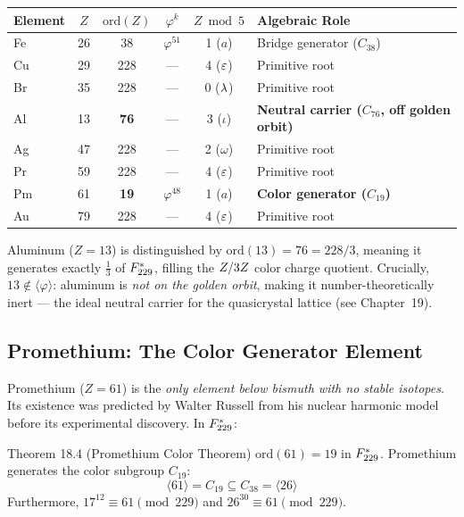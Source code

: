 \begin{center}
\begin{tabular}{lccccl}
\toprule
\textbf{Element} & $Z$ & $\text{ord}(Z)$ & $\varphi^k$ & $Z \bmod 5$ & \textbf{Algebraic Role} \\
\midrule
Fe & 26 & 38 & $\varphi^{51}$ & 1 ($a$) & Bridge generator ($C_{38}$) \\
Cu & 29 & 228 & --- & 4 ($\varepsilon$) & Primitive root \\
Br & 35 & 228 & --- & 0 ($\lambda$) & Primitive root \\
Al & 13 & \textbf{76} & --- & 3 ($\iota$) & \textbf{Neutral carrier ($C_{76}$, off golden orbit)} \\
Ag & 47 & 228 & --- & 2 ($\omega$) & Primitive root \\
Pr & 59 & 228 & --- & 4 ($\varepsilon$) & Primitive root \\
Pm & 61 & \textbf{19} & $\varphi^{48}$ & 1 ($a$) & \textbf{Color generator ($C_{19}$)} \\
Au & 79 & 228 & --- & 4 ($\varepsilon$) & Primitive root \\
\bottomrule
\end{tabular}
\end{center}

\noindent Aluminum ($Z=13$) is distinguished by $\text{ord}(13) = 76 = 228/3$, meaning it generates exactly $\frac{1}{3}$ of $F_{229}^*$, filling the $Z/3Z$ color charge quotient. Crucially, $13 \notin \langle \varphi \rangle$: aluminum is \emph{not on the golden orbit}, making it number-theoretically inert --- the ideal neutral carrier for the quasicrystal lattice (see Chapter~19).

\subsection{Promethium: The Color Generator Element}

Promethium ($Z=61$) is the \emph{only element below bismuth with no stable isotopes}. Its existence was predicted by Walter Russell from his nuclear harmonic model before its experimental discovery. In $F_{229}^*$:

\begin{theorembox}{Theorem 18.4 (Promethium Color Theorem)}
$\text{ord}(61) = 19$ in $F_{229}^*$. Promethium generates the color subgroup $C_{19}$:
\[ \langle 61 \rangle = C_{19} \subseteq C_{38} = \langle 26 \rangle \]
Furthermore, $17^{12} \equiv 61 \pmod{229}$ and $26^{30} \equiv 61 \pmod{229}$.
\end{theorembox}

